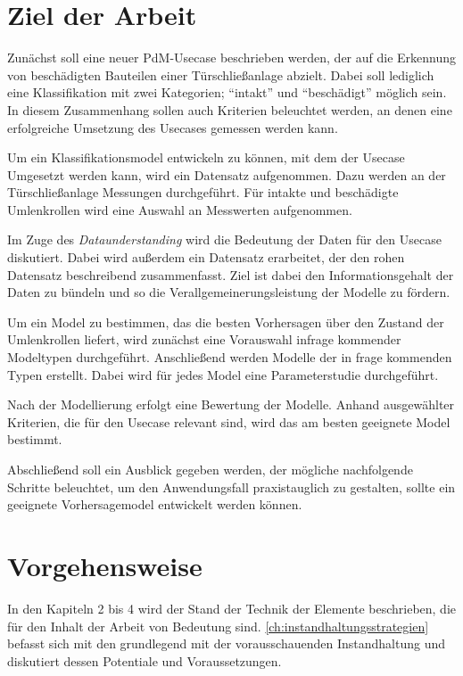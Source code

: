 
\section{Ziel der Arbeit}
\label{sec:ziel}
Zunächst soll eine neuer PdM-Usecase beschrieben werden, der auf die Erkennung von beschädigten Bauteilen einer Türschließanlage abzielt. Dabei soll lediglich eine Klassifikation mit zwei Kategorien; \enquote{intakt} und \enquote{beschädigt} möglich sein. In diesem Zusammenhang sollen auch Kriterien beleuchtet werden, an denen eine erfolgreiche Umsetzung des Usecases gemessen werden kann.

Um ein Klassifikationsmodel entwickeln zu können, mit dem der Usecase Umgesetzt werden kann, wird ein Datensatz aufgenommen. Dazu werden an der Türschließanlage Messungen durchgeführt. Für intakte und beschädigte Umlenkrollen wird eine Auswahl an Messwerten aufgenommen. 

Im Zuge des \textit{Dataunderstanding} wird die Bedeutung der Daten für den Usecase diskutiert. Dabei wird außerdem ein Datensatz erarbeitet, der den rohen Datensatz beschreibend zusammenfasst. Ziel ist dabei den Informationsgehalt der Daten zu bündeln und so die Verallgemeinerungsleistung der Modelle zu fördern.

Um ein Model zu bestimmen, das die besten Vorhersagen über den Zustand der Umlenkrollen liefert, wird zunächst eine Vorauswahl infrage kommender Modeltypen durchgeführt. Anschließend werden Modelle der in frage kommenden Typen erstellt. Dabei wird für jedes Model eine Parameterstudie durchgeführt.

Nach der Modellierung erfolgt eine Bewertung der Modelle. Anhand ausgewählter Kriterien, die für den Usecase relevant sind, wird das am besten geeignete Model bestimmt.

Abschließend soll ein Ausblick gegeben werden, der mögliche nachfolgende Schritte beleuchtet, um den Anwendungsfall praxistauglich zu gestalten, sollte ein geeignete Vorhersagemodel entwickelt werden können.

\section{Vorgehensweise}
\label{sec:vorgehensweise}
In den Kapiteln 2 bis 4 wird der Stand der Technik der Elemente beschrieben, die für den Inhalt der Arbeit von Bedeutung sind. \cref{ch:instandhaltungsstrategien} befasst sich mit den grundlegend mit der vorausschauenden Instandhaltung und diskutiert dessen Potentiale und Voraussetzungen.

